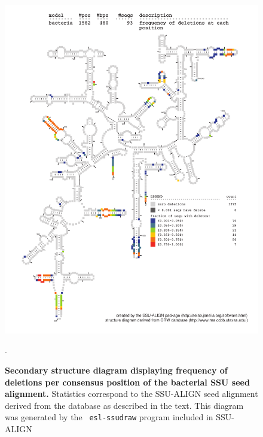 \begin{figure}
\begin{center}
\includegraphics[width=5.7in]{Figures/bacteria-0p1-dall}
\end{center}
\caption[Secondary structure diagram displaying frequency of deletions
  per consensus position of the bacterial SSU seed
  alignment]{\textbf{Secondary structure diagram displaying frequency 
  of deletions per consensus position of the bacterial SSU seed
  alignment.} Statistics correspond to the SSU-ALIGN seed
  alignment derived from the  database \cite{CannoneGutell02}
  as described in the text. This diagram was generated by the {\tt
  esl-ssudraw} program included in SSU-ALIGN}.
\label{fig:bacdel}
\end{figure}



